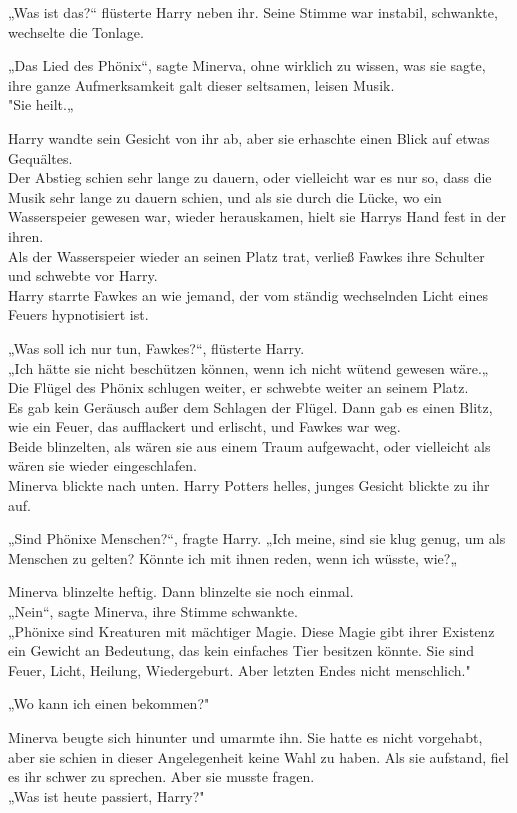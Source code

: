 {„Was ist das?“ flüsterte Harry neben ihr. Seine Stimme war instabil, schwankte, wechselte die Tonlage.

„Das Lied des Phönix“, sagte Minerva, ohne wirklich zu wissen, was sie sagte, ihre ganze Aufmerksamkeit galt dieser seltsamen, leisen Musik.\\ "Sie heilt.„

Harry wandte sein Gesicht von ihr ab, aber sie erhaschte einen Blick auf etwas Gequältes.\\ Der Abstieg schien sehr lange zu dauern, oder vielleicht war es nur so, dass die Musik sehr lange zu dauern schien, und als sie durch die Lücke, wo ein Wasserspeier gewesen war, wieder herauskamen, hielt sie Harrys Hand fest in der ihren.\\ Als der Wasserspeier wieder an seinen Platz trat, verließ Fawkes ihre Schulter und schwebte vor Harry.\\ Harry starrte Fawkes an wie jemand, der vom ständig wechselnden Licht eines Feuers hypnotisiert ist.

„Was soll ich nur tun, Fawkes?“, flüsterte Harry.\\ „Ich hätte sie nicht beschützen können, wenn ich nicht wütend gewesen wäre.„\\ Die Flügel des Phönix schlugen weiter, er schwebte weiter an seinem Platz.\\ Es gab kein Geräusch außer dem Schlagen der Flügel. Dann gab es einen Blitz, wie ein Feuer, das aufflackert und erlischt, und Fawkes war weg.\\ Beide blinzelten, als wären sie aus einem Traum aufgewacht, oder vielleicht als wären sie wieder eingeschlafen.\\ Minerva blickte nach unten. Harry Potters helles, junges Gesicht blickte zu ihr auf.

„Sind Phönixe Menschen?“, fragte Harry. „Ich meine, sind sie klug genug, um als Menschen zu gelten? Könnte ich mit ihnen reden, wenn ich wüsste, wie?„

Minerva blinzelte heftig. Dann blinzelte sie noch einmal.\\ „Nein“, sagte Minerva, ihre Stimme schwankte.\\ „Phönixe sind Kreaturen mit mächtiger Magie. Diese Magie gibt ihrer Existenz ein Gewicht an Bedeutung, das kein einfaches Tier besitzen könnte. Sie sind Feuer, Licht, Heilung, Wiedergeburt. Aber letzten Endes nicht menschlich."

„Wo kann ich einen bekommen?"

Minerva beugte sich hinunter und umarmte ihn. Sie hatte es nicht vorgehabt, aber sie schien in dieser Angelegenheit keine Wahl zu haben. Als sie aufstand, fiel es ihr schwer zu sprechen. Aber sie musste fragen.\\ „Was ist heute passiert, Harry?"

}
